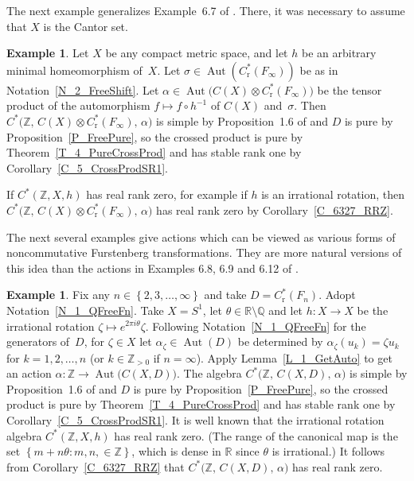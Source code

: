 \documentclass[10pt]{amsart}
\numberwithin{equation}{section}
\theoremstyle{definition}
\newtheorem{exa}[thm]{Example}
\newcommand{\af}{\alpha}
\newcommand{\zt}{\zeta}
\newcommand{\te}{\theta}
\newcommand{\sm}{\sigma}
\newcommand{\Q}{{\mathbb{Q}}}
\newcommand{\Z}{{\mathbb{Z}}}
\newcommand{\R}{{\mathbb{R}}}
\newcommand{\N}{{\mathbb{Z}}_{> 0}}
\newcommand{\Aut}{{\operatorname{Aut}}}
\newcommand{\I}{\infty}
\newcommand{\set}[1]{\left\{ #1 \right\}}
\begin{document}
The next example generalizes Example~6.7 of \cite{ArBcPh2}.
There, it was necessary to assume that $X$ is the Cantor
set.

\begin{exa}\label{E_4_FreeShift}
Let $X$ be any compact metric space, and let $h$ be an
arbitrary minimal homeomorphism of~$X$.
Let
$\sm \in \Aut ( C^*_{\mathrm{r}} (F_{\infty}) )$ be as
in Notation~\ref{N_2_FreeShift}.
Let
$\af \in \Aut \bigl( C (X) \otimes C^*_{\mathrm{r}} (F_{\infty}) \bigr)$
be the tensor product of the automorphism
$f \mapsto f \circ h^{-1}$ of $C (X)$ and~$\sm$.
Then
$C^* \bigl( \Z, \, C (X) \otimes C^*_{\mathrm{r}} (F_{\infty}),
  \, \af \bigr)$
is simple by Proposition~1.6 of \cite{ArBcPh2}
and $D$ is pure by Proposition~\ref{P_FreePure},
so the crossed product is pure by Theorem~\ref{T_4_PureCrossProd}
and has stable rank one by Corollary~\ref{C_5_CrossProdSR1}.

If $C^* (\Z, X, h)$ has real rank zero,
for example if $h$ is an irrational rotation, then
$C^* \bigl( \Z, \, C (X) \otimes C^*_{\mathrm{r}} (F_{\infty}),
  \, \af \bigr)$
has real rank zero by Corollary~\ref{C_6327_RRZ}.
\end{exa}

The next several examples give actions which can be viewed
as various forms of noncommutative Furstenberg transformations.
They are more natural versions of this idea than the
actions in Examples 6.8, 6.9 and 6.12 of \cite{ArBcPh2}.

\begin{exa}\label{E_5_IrrRot}
Fix any $n \in \set{ 2, 3, \ldots, \infty }$ and take
$D = C^*_{\mathrm{r}} (F_{n})$.
Adopt Notation~\ref{N_1_QFreeFn}.
Take $X = S^{1}$, let
$\te \in \R \setminus \Q$ and let $h \colon X \to X$ be the
irrational rotation  $\zt \mapsto e^{2 \pi i \te} \zt$.
Following Notation~\ref{N_1_QFreeFn} for the
generators of~$D$, for $\zt \in X$ let
$\af_{\zt} \in \Aut (D)$ be determined by
$\af_{\zt} (u_k) = \zt u_k$ for
$k = 1, 2, \ldots, n$ (or $k \in \N$ if $n = \I$).
Apply Lemma~\ref{L_1_GetAuto} to get an action
$\af \colon \Z \to \Aut \big( C (X, D ) \big)$.
The algebra
$C^* \bigl( \Z, \, C (X, D ), \, \af \bigr)$
is simple by Proposition~1.6 of \cite{ArBcPh2} and
$D$ is pure by Proposition~\ref{P_FreePure},
so the crossed product is pure by
Theorem~\ref{T_4_PureCrossProd} and has stable
rank one by Corollary~\ref{C_5_CrossProdSR1}.
It is well known that the irrational rotation
algebra $C^* ( \Z, X, h )$ has real rank zero.
(The range of the canonical map is the set
$\set{m + n \theta \colon m, n, \in \Z}$, which is
dense in $\R$ since $\theta$ is irrational.)
It follows from Corollary~\ref{C_6327_RRZ} that
$C^* \bigl( \Z, \, C (X, D ), \, \af \bigr)$ has real rank zero.
\end{exa}
\end{document}
